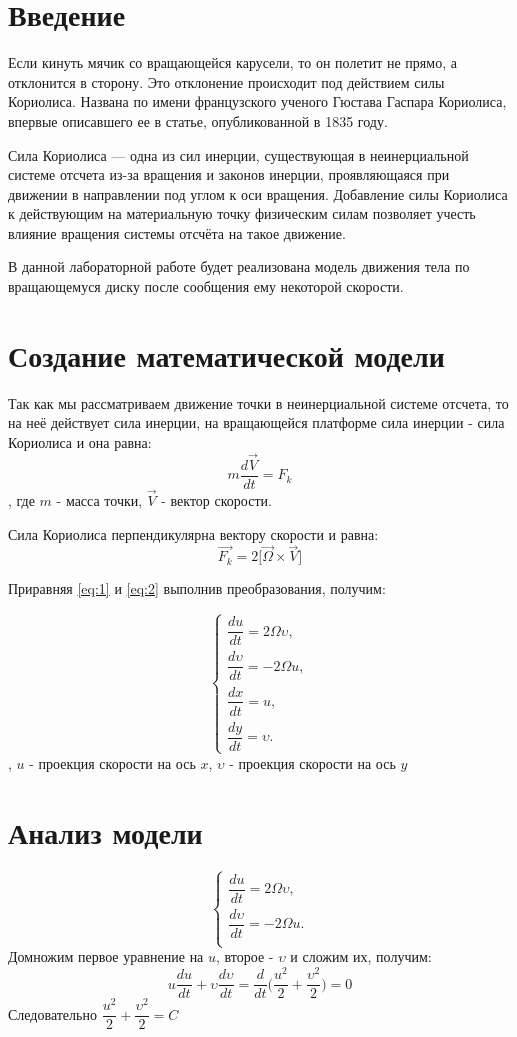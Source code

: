 \documentclass[a4paper, 14pt]{extarticle}
\begin{document}
	\pagebreak	

	\section{Введение}	
		Если кинуть мячик со вращающейся карусели, то он полетит не прямо, а отклонится в сторону. Это отклонение происходит под действием силы Кориолиса. Названа по имени французского ученого Гюстава Гаспара Кориолиса, впервые описавшего ее в статье, опубликованной в 1835 году.
		
 		Сила Кориолиса — одна из сил инерции, существующая в неинерциальной системе отсчета из-за вращения и законов инерции, проявляющаяся при движении в направлении под углом к оси вращения. Добавление силы Кориолиса к действующим на материальную точку физическим силам позволяет учесть влияние вращения системы отсчёта на такое движение. 
 		
 		В данной лабораторной работе будет реализована модель движения тела по вращающемуся диску после сообщения ему некоторой скорости.

	\section{Создание математической модели}
		Так как мы рассматриваем движение точки в неинерциальной системе отсчета, то на неё действует сила  инерции, на вращающейся платформе сила инерции - сила Кориолиса и она равна:
		\[ m\dfrac{d\vec{V}}{dt} = F_k \tag{1} \label{eq:1} \], где
		$m$ - масса точки, $\vec{V}$ - вектор скорости.
		
		Сила Кориолиса перпендикулярна вектору скорости и равна:
		\[ \vec{F_k} = 2 \Big[\vec{\Omega}\times\vec{V}\Big] \tag{2} \label{eq:2} \]
		
		Приравняя \eqref{eq:1} и \eqref{eq:2} выполнив преобразования, получим:
		
		\[\begin{cases}
			\dfrac{du}{dt} = 2\Omega\upsilon,\\
			\dfrac{d\upsilon}{dt} = -2\Omega u,\\
			\dfrac{dx}{dt} = u,\\
			\dfrac{dy}{dt} = \upsilon.
		\end{cases}\],
		$u$ - проекция скорости на ось $x$, $\upsilon$ - проекция скорости на ось $y$
		
	\section{Анализ модели}
		\[\begin{cases}
			\dfrac{du}{dt} = 2\Omega\upsilon,\\
			\dfrac{d\upsilon}{dt} = -2\Omega u.\\
		\end{cases}\]
		Домножим первое уравнение на $u$, второе - $\upsilon$  и сложим их, получим:
		\[u\dfrac{du}{dt} + \upsilon\dfrac{d\upsilon}{dt} = \dfrac{d}{dt}\Bigg( \dfrac{u^2}{2} + \dfrac{\upsilon^2}{2} \Bigg) = 0 \]
		Следовательно $ \dfrac{u^2}{2} + \dfrac{\upsilon^2}{2} = C$
	
\end{document}
